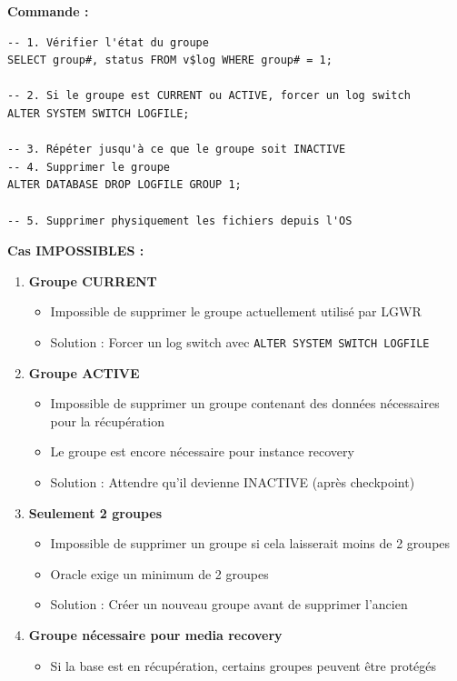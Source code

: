 \documentclass[11pt,a4paper]{article}
\begin{document}
\textbf{Commande :}

\begin{commandebox}
\begin{lstlisting}
-- 1. Vérifier l'état du groupe
SELECT group#, status FROM v$log WHERE group# = 1;

-- 2. Si le groupe est CURRENT ou ACTIVE, forcer un log switch
ALTER SYSTEM SWITCH LOGFILE;

-- 3. Répéter jusqu'à ce que le groupe soit INACTIVE
-- 4. Supprimer le groupe
ALTER DATABASE DROP LOGFILE GROUP 1;

-- 5. Supprimer physiquement les fichiers depuis l'OS
\end{lstlisting}
\end{commandebox}

\textbf{Cas IMPOSSIBLES :}

\begin{enumerate}
    \item \textbf{Groupe CURRENT}
    \begin{itemize}
        \item Impossible de supprimer le groupe actuellement utilisé par LGWR
        \item Solution : Forcer un log switch avec \texttt{ALTER SYSTEM SWITCH LOGFILE}
    \end{itemize}
    
    \item \textbf{Groupe ACTIVE}
    \begin{itemize}
        \item Impossible de supprimer un groupe contenant des données nécessaires pour la récupération
        \item Le groupe est encore nécessaire pour instance recovery
        \item Solution : Attendre qu'il devienne INACTIVE (après checkpoint)
    \end{itemize}
    
    \item \textbf{Seulement 2 groupes}
    \begin{itemize}
        \item Impossible de supprimer un groupe si cela laisserait moins de 2 groupes
        \item Oracle exige un minimum de 2 groupes
        \item Solution : Créer un nouveau groupe avant de supprimer l'ancien
    \end{itemize}
    
    \item \textbf{Groupe nécessaire pour media recovery}
    \begin{itemize}
        \item Si la base est en récupération, certains groupes peuvent être protégés
    \end{itemize}
\end{enumerate}
\end{document}
